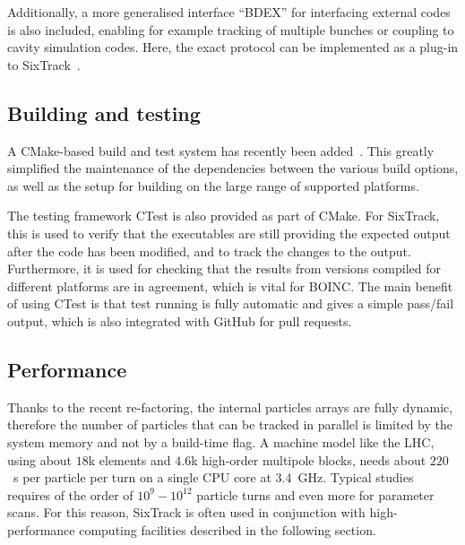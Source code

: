 \documentclass[a4paper,
              ]{jacow}
\begin{document}
Additionally, a more generalised interface ``BDEX'' for interfacing external codes is also included, enabling for example tracking of multiple bunches or coupling to cavity simulation codes.
Here, the exact protocol can be implemented as a plug-in to SixTrack~\cite{recentDevels2}.


\subsection{Building and testing}

A CMake-based build and test system has recently been added~\cite{recentDevels2}. This greatly simplified the maintenance of the dependencies between the various build options, as well as the setup for building on the large range of supported platforms.

The testing framework CTest is also provided as part of CMake. For SixTrack, this is used to verify that the executables are still providing the expected output after the code has been modified, and to track the changes to the output. Furthermore, it is used for checking that the results from versions compiled for different platforms are in agreement, which is vital for BOINC. The main benefit of using CTest is that test running is fully automatic and gives a simple pass/fail output, which is also integrated with GitHub for pull requests.

\subsection{Performance}

Thanks to the recent re-factoring, the internal particles arrays are fully dynamic, therefore the number of particles that can be tracked in parallel is limited by the system memory and not by a build-time flag. A machine model like the LHC, using about $18$k elements and $4.6$k high-order multipole blocks, needs about $220$~\textmu s per particle per turn on a single CPU core at 3.4~GHz. Typical studies requires of the order of $10^9 - 10^{12}$ particle turns and even more for parameter scans. For this reason, SixTrack is often used in conjunction with high-performance computing facilities described in the following section.
\end{document}
